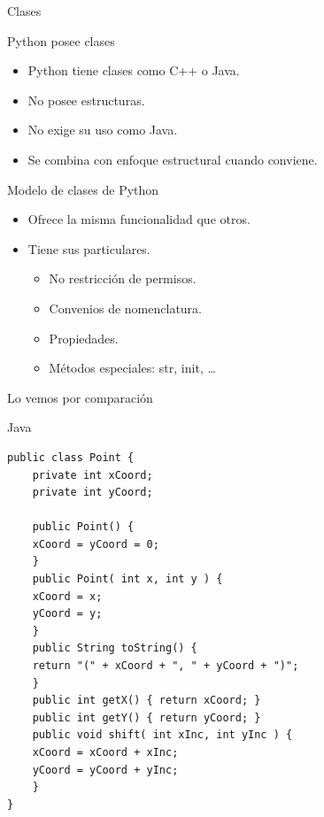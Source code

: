 \documentclass[bigger,unknownkeysallowed]{beamer}
\begin{document}
\begin{frame}[label={sec:org48b2088}]{Clases}
\begin{block}{Python posee clases}
\begin{itemize}
\item Python tiene \alert{clases} como C++ o Java.

\item No posee estructuras.

\item No exige su uso como Java.

\item Se combina con enfoque estructural cuando conviene.
\end{itemize}
\end{block}

\begin{block}{Modelo de clases de Python}
\begin{itemize}
\item Ofrece la misma funcionalidad que otros.

\item Tiene sus particulares.

\begin{itemize}
\item No restricción de permisos.

\item Convenios de nomenclatura.

\item Propiedades.

\item Métodos especiales: str, init, \ldots{}
\end{itemize}
\end{itemize}
\end{block}
\end{frame}

\begin{frame}[fragile,label={sec:orgb63033a}]{Lo vemos por comparación}
 \begin{block}{Java}
\begin{verbatim}
public class Point {
    private int xCoord;
    private int yCoord;

    public Point() {
	xCoord = yCoord = 0;
    }
    public Point( int x, int y ) {
	xCoord = x;
	yCoord = y;
    }
    public String toString() {
	return "(" + xCoord + ", " + yCoord + ")";
    }
    public int getX() { return xCoord; }
    public int getY() { return yCoord; }
    public void shift( int xInc, int yInc ) {
	xCoord = xCoord + xInc;
	yCoord = yCoord + yInc;
    }
}
\end{verbatim}
\end{block}
\end{frame}
\end{document}
